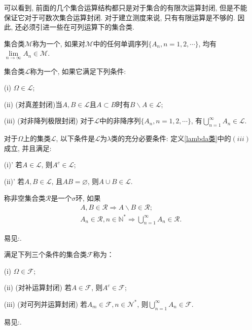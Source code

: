 可以看到, 前面的几个集合运算结构都只是对于集合的有限次运算封闭, 但是不能保证它对于可数次集合运算封闭. 对于建立测度来说, 只有有限运算是不够的. 因此, 还必须引进一些在可列运算下的集合类.
\begin{definition}[单调类]
	集合类$\mathscr{M}$称为一个, 如果对$\mathscr{M}$中的任何单调序列$\{A_n,n=1,2,\cdots \}$, 均有$\lim\limits_{n\to\infty}A_n\in\mathscr{M}$.
\end{definition}

\begin{definition}[$\lambda$类]\label{lambda类}
	集合类$\mathscr{L}$称为一个, 如果它满足下列条件:
	\begin{blist}
		\item[(i)] $\Omega\in\mathscr{L}$;
		\item[(ii)](对真差封闭)当$A,B\in\mathscr{L}$且$A\subset B$时有$B\backslash A\in\mathscr{L}$;
		\item[(iii)](对非降列极限封闭) 对于$\mathscr{L}$中的非降序列$\{A_n,n=1,2,\cdots\}$, 有$\bigcup\limits_{n=1}^{\infty}A_n\in\mathscr{L}$.
	\end{blist}
\end{definition}


\begin{example}
	对于$\Omega$上的集类$\mathscr{L}$, 以下条件是$\mathscr{L}$为$\lambda$类的充分必要条件:
	定义\ref{lambda类}中的$(iii)$成立, 并且满足:
	\begin{blist}
		\item[(i)']若$A\in\mathscr{L}$, 则$A^c\in\mathscr{L}$;
		\item[(ii)']若$A,B\in\mathscr{L}$, 且$AB = \varnothing$, 则$A\cup B\in\mathscr{L}$.
	\end{blist}
\end{example}

\begin{definition}[$\sigma$环]
	称非空集合类$\mathscr{R}$是一个$\sigma$环, 如果
	\begin{align}
	&A,B\in\mathscr{R}\Rightarrow A\backslash B\in\mathscr{R};\nonumber\\
	&A_n\in\mathscr{R},n\in\mathbb{N}^*\Rightarrow \bigcup_{n=1}^{\infty}A_n\in\mathscr{R}.
	\end{align}
\end{definition}
易见:.

\begin{definition}[$\sigma$代数]
	满足下列三个条件的集合类$\mathscr{F}$称为：
	\begin{blist}
		\item[(i)] $\Omega\in\mathscr{F}$;
		\item[(ii)](对补运算封闭) 若$A\in\mathscr{F}$, 则$A^c\in\mathscr{F}$;
		\item[(iii)](对可列并运算封闭) 若$A_m\in\mathscr{F},n\in\mathscr{N}^*$, 则$\bigcup\limits_{n=1}^{\infty}A_n\in\mathscr{F}$.
	\end{blist}
\end{definition}
易见:.

